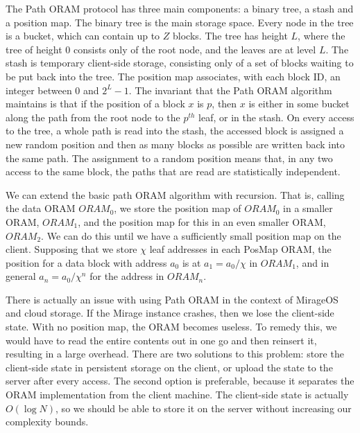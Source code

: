 \documentclass[12pt,a4paper,twoside]{article}
\begin{document}

The Path ORAM protocol has three main components: a binary tree, a stash and a position map. The binary tree is the main storage space. Every node in the tree is a bucket, which can contain up to $Z$ blocks. The tree has height $L$, where the tree of height 0 consists only of the root node, and the leaves are at level $L$. The stash is temporary client-side storage, consisting only of a set of blocks waiting to be put back into the tree. The position map associates, with each block ID, an integer between 0 and $2^L-1$. The invariant that the Path ORAM algorithm maintains is that if the position of a block $x$ is $p$, then $x$ is either in some bucket along the path from the root node to the $p^{th}$ leaf, or in the stash. On every access to the tree, a whole path is read into the stash, the accessed block is assigned a new random position and then as many blocks as possible are written back into the same path. The assignment to a random position means that, in any two access to the same block, the paths that are read are statistically independent.


We can extend the basic path ORAM algorithm with recursion. That is, calling the data ORAM $ORAM_0$, we store the position map of $ORAM_0$ in a smaller ORAM, $ORAM_1$, and the position map for this in an even smaller ORAM, $ORAM_2$. We can do this until we have a sufficiently small position map on the client. Supposing that we store $\chi$ leaf addresses in each PosMap ORAM, the position for a data block with address $a_0$ is at $a_1 = a_0 / \chi$ in $ORAM_1$, and in general $a_n = a_0 / \chi^n$ for the address in $ORAM_n$. 


There is actually an issue with using Path ORAM in the context of MirageOS and cloud storage. If the Mirage instance crashes, then we lose the client-side state. With no position map, the ORAM becomes useless. To remedy this, we would have to read the entire contents out in one go and then reinsert it, resulting in a large overhead. There are two solutions to this problem: store the client-side state in persistent storage on the client, or upload the state to the server after every access. The second option is preferable, because it separates the ORAM implementation from the client machine. The client-side state is actually $O(\log N)$, so we should be able to store it on the server without increasing our complexity bounds. 
\end{document}
